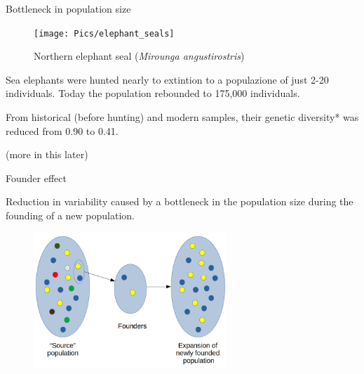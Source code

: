 \begin{frame}{Bottleneck in population size}

	\bigskip
        \begin{figure}
                \texttt{[image: Pics/elephant\_seals]} \\
		\caption{Northern elephant seal (\textit{Mirounga angustirostris})}
        \end{figure}

	\small
	Sea elephants were hunted nearly to extintion to a populazione of just 2-20 individuals. Today the population rebounded to 175,000 individuals.

	From historical (before hunting) and modern samples, their genetic diversity* was reduced from 0.90 to 0.41.

	\vskip 0.5cm
	\tiny * (more in this later)

\end{frame}


\begin{frame}{Founder effect}

	\bigskip
	\begin{block}{}
		Reduction in variability caused by a bottleneck in the population size during the founding of a new population.
	\end{block}

	\begin{figure}
                \includegraphics[width=0.65\textwidth]{Pics/founder}
        \end{figure}

\end{frame}


